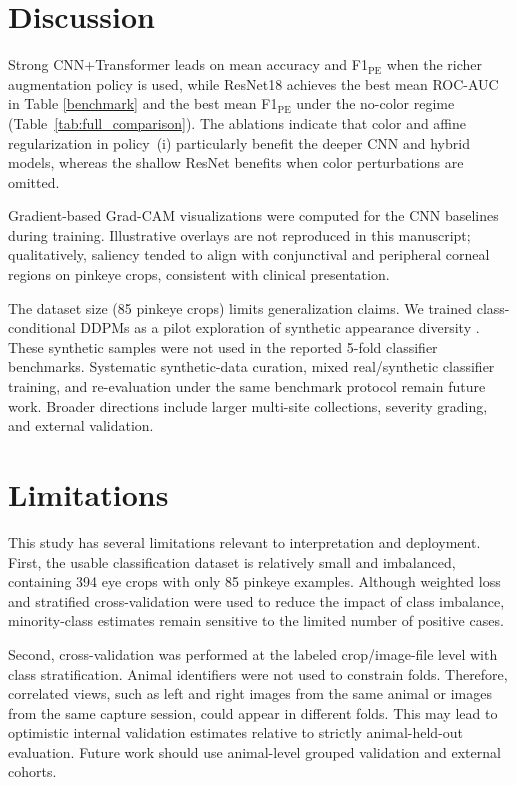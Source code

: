 \documentclass[preprint,12pt,authoryear]{elsarticle}
\begin{document}


\section{Discussion}
\label{discussion}

Strong CNN+Transformer leads on mean accuracy and F1$_{\mathrm{PE}}$ when the richer augmentation policy is used, while ResNet18 achieves the best mean ROC-AUC in Table \ref{benchmark} and the best mean F1$_{\mathrm{PE}}$ under the no-color regime (Table~\ref{tab:full_comparison}). The ablations indicate that color and affine regularization in policy~(i) particularly benefit the deeper CNN and hybrid models, whereas the shallow ResNet benefits when color perturbations are omitted.

Gradient-based Grad-CAM visualizations \citep{selvaraju2017gradcam} were computed for the CNN baselines during training. Illustrative overlays are not reproduced in this manuscript; qualitatively, saliency tended to align with conjunctival and peripheral corneal regions on pinkeye crops, consistent with clinical presentation.

The dataset size (85 pinkeye crops) limits generalization claims. We trained class-conditional DDPMs as a pilot exploration of synthetic appearance diversity \citep{ho2020ddpm}. These synthetic samples were not used in the reported 5-fold classifier benchmarks. Systematic synthetic-data curation, mixed real/synthetic classifier training, and re-evaluation under the same benchmark protocol remain future work. Broader directions include larger multi-site collections, severity grading, and external validation.

\section{Limitations}
\label{limitations}

This study has several limitations relevant to interpretation and deployment. First, the usable classification dataset is relatively small and imbalanced, containing 394 eye crops with only 85 pinkeye examples. Although weighted loss and stratified cross-validation were used to reduce the impact of class imbalance, minority-class estimates remain sensitive to the limited number of positive cases.

Second, cross-validation was performed at the labeled crop/image-file level with class stratification. Animal identifiers were not used to constrain folds. Therefore, correlated views, such as left and right images from the same animal or images from the same capture session, could appear in different folds. This may lead to optimistic internal validation estimates relative to strictly animal-held-out evaluation. Future work should use animal-level grouped validation and external cohorts.
\end{document}
